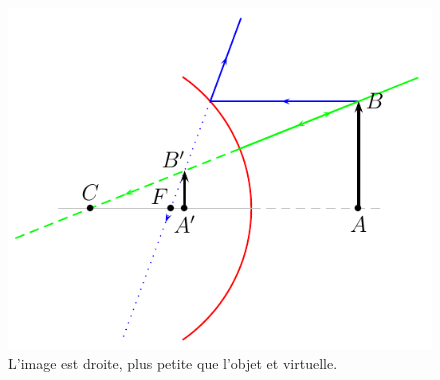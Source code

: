 \begin{figure}
\centering
\includegraphics{fig27144_1.png}
\caption{L'image est droite, plus petite que l'objet et virtuelle.}  \label{FigConvexeEx}
\end{figure}
